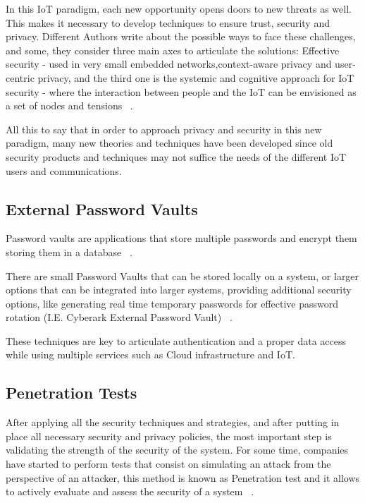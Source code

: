 \documentclass[sigconf]{acmart}
\begin{document}
In this IoT paradigm, each new opportunity opens doors to new threats as well. This makes it necessary to develop techniques to ensure trust, security and privacy. Different Authors write about the possible ways to face these challenges, and some, they consider three main axes to articulate the solutions: Effective security - used in very small embedded networks,context-aware privacy and user-centric privacy, and the third one is the systemic and cognitive approach for IoT security - where the interaction between people and the IoT can be envisioned as a set of nodes and tensions ~\cite{riahi2014systemic}.

All this to say that in order to approach privacy and security in this new paradigm, many new theories and techniques have been developed since old security products and techniques may not suffice the needs of the different IoT users and communications.


\subsection{External Password Vaults}

Password vaults are applications that store multiple passwords and encrypt them storing them in a database ~\cite{chatterjee2015cracking}.

There are small Password Vaults that can be stored locally on a system, or larger options that can be integrated into larger systems, providing additional security options, like generating real time temporary passwords for effective password rotation (I.E. Cyberark External Password Vault) ~\cite{nelson2015practical}.

These techniques are key to articulate authentication and a proper data access while using multiple services such as Cloud infrastructure and IoT.

\subsection{Penetration Tests}

After applying all the security techniques and strategies, and after putting in place all necessary security and privacy policies, the most important step is validating the strength of the security of the system. For some time, companies have started to perform tests that consist on simulating an attack from the perspective of an attacker, this method is known as Penetration test and it allows to actively evaluate and assess the security of a system ~\cite{shivayogimathoverview}.
\end{document}
